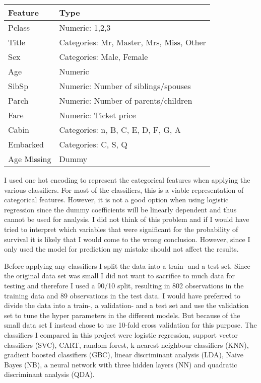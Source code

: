 \documentclass[11pt,twoside,swedish]{article}
\begin{document}
\begin{table}
  \begin{center}
\begin{tabular}{ l l }
 Feature & Type \\ 
 \hline
 Pclass &   Numeric: 1,2,3\\
Title & Categories: Mr, Master, Mrs, Miss, Other\\
Sex & Categories: Male, Female\\
Age & Numeric\\
SibSp & Numeric: Number of siblings/spouses\\
Parch & Numeric: Number of parents/children\\
Fare & Numeric: Ticket price\\
Cabin & Categories: n, B, C, E, D, F, G, A\\
Embarked & Categories: C, S, Q\\
Age Missing & Dummy
\end{tabular}
\end{center}
\label{titanic features}
\end{table}

I used one hot encoding to represent the categorical features when
applying the various classifiers. For most of the classifiers, this is
a viable representation of categorical features. However, it is not a
good option when using logistic regression since the dummy
coefficients will be linearly dependent and thus cannot be used for
analysis. I did not think of this problem and if I would have tried to
interpret which variables that were significant for the probability of
survival it is likely that I would come to the wrong
conclusion. However, since I only used the model for prediction my
mistake should not affect the results.

Before applying any classifiers I split the data into a train- and a
test set. Since the original data set was small I did not want to
sacrifice to much data for testing and therefore I used a 90/10
split, resulting in 802 observations in the training data and 89
observations in the test data. I would have preferred to divide the
data into a train-, a validation- and a test set and use the
validation set to tune the hyper parameters in the different models.
But because of the small data set I instead chose to use 10-fold cross
validation for this purpose. The classifiers I compared in
this project were logistic regression, support vector classifiers
(SVC), CART, random forest, k-nearest neighbour classifiers (KNN), gradient
boosted classifiers (GBC), linear discriminant analysis (LDA), Naive
Bayes (NB), a neural network with three hidden layers (NN) and
quadratic discriminant analysis (QDA).
\end{document}
